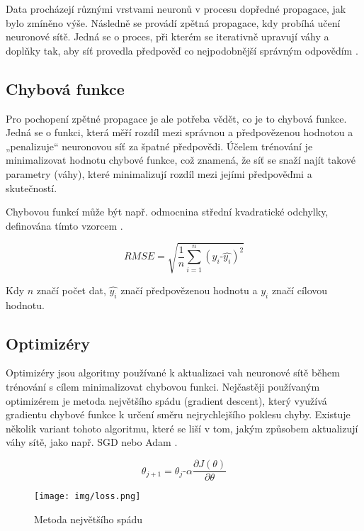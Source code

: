 \documentclass[FM,DP]{tulthesis}
\begin{document}
		Data procházejí různými vrstvami neuronů v procesu dopředné propagace, jak bylo zmíněno výše. Následně se provádí zpětná propagace, kdy probíhá učení neuronové sítě. Jedná se o proces, při kterém se iterativně upravují váhy a doplňky tak, aby síť provedla předpověď co nejpodobnější správným odpovědím \cite{rubiks_code}.
		
		\subsection{Chybová funkce}
		Pro pochopení zpětné propagace je ale potřeba vědět, co je to chybová funkce. Jedná se o funkci, která měří rozdíl mezi správnou a předpovězenou hodnotou a „penalizuje“ neuronovou síť za špatné předpovědi. Účelem trénování je minimalizovat hodnotu chybové funkce, což znamená, že síť se snaží najít takové parametry (váhy), které minimalizují rozdíl mezi jejími předpověďmi a skutečností.
		
		Chybovou funkcí může být např. odmocnina střední kvadratické odchylky, definována tímto vzorcem \cite{RMSE}.
		
		\begin{equation}
			RMSE = \sqrt{\frac{1}{n}\sum_{i=1}^{n}(y_i ‑ \hat{y_i})^2}
		\end{equation}
		
		Kdy $n$ značí počet dat, $\hat{y_i}$ značí předpovězenou hodnotu a $y_i$ značí cílovou hodnotu. 
		
		\subsection{Optimizéry}
		Optimizéry jsou algoritmy používané k aktualizaci vah neuronové sítě během trénování s cílem minimalizovat chybovou funkci. Nejčastěji používaným optimizérem je metoda největšího spádu (gradient descent), který využívá gradientu chybové funkce k určení směru nejrychlejšího poklesu chyby. Existuje několik variant tohoto algoritmu, které se liší v tom, jakým způsobem aktualizují váhy sítě, jako např. SGD nebo Adam \cite{gradient_descent}.
		
		
		\begin{equation}
			\theta_{j+1} = \theta_j ‑ \alpha \frac{\partial J(\theta)}{\partial \theta}
		\end{equation}
		
		
		\begin{figure}[H]
			\centering
			\texttt{[image: img/loss.png]}
			\caption{Metoda největšího spádu \cite{general}}
			\label{fig:sgd}
		\end{figure}
		
\end{document}
